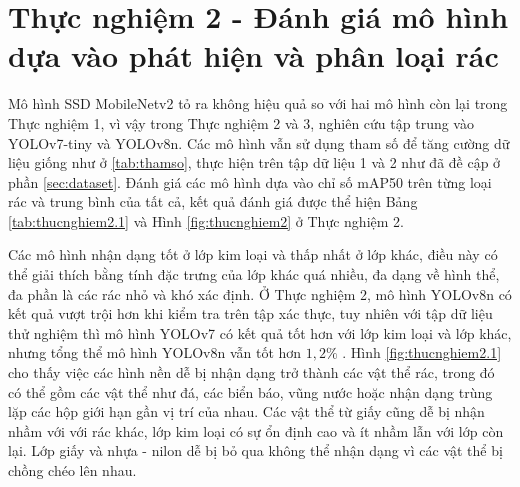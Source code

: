 \documentclass[../the.tex]{subfiles}
\begin{document}
\section{Thực nghiệm 2 - Đánh giá mô hình dựa vào phát hiện và phân loại rác}

 {\fontsize{13}{12} \selectfont

  Mô hình SSD MobileNetv2 tỏ ra không hiệu quả so với hai mô hình còn lại trong Thực nghiệm 1, vì vậy trong Thực nghiệm 2 và 3, nghiên cứu tập trung vào YOLOv7-tiny và YOLOv8n. 
  Các mô hình vẫn sử dụng tham số để tăng cường dữ liệu giống như ở \ref{tab:thamso}, thực hiện trên tập dữ liệu 1 và 2 như đã đề cập ở phần \ref{sec:dataset}.
  Đánh giá các mô hình dựa vào chỉ số mAP50 trên từng loại rác và trung bình của tất cả, kết quả đánh giá được thể hiện Bảng \ref{tab:thucnghiem2.1} và Hình \ref{fig:thucnghiem2} ở Thực nghiệm 2.
 
  }

\bigskip

{\fontsize{13}{12} \selectfont

    Các mô hình nhận dạng tốt ở lớp kim loại và thấp nhất ở lớp khác,
    điều này có thể giải thích bằng tính đặc trưng của lớp khác quá nhiều, đa dạng về hình thể, đa phần là các rác nhỏ và khó xác định.
    Ở Thực nghiệm 2, mô hình YOLOv8n có kết quả vượt trội hơn khi kiểm tra trên tập xác thực, tuy nhiên với tập dữ liệu thử nghiệm thì mô hình YOLOv7 có kết quả tốt hơn với lớp kim loại và lớp khác, nhưng tổng thể mô hình YOLOv8n vẫn tốt hơn $1,2\%$ .
    Hình \ref{fig:thucnghiem2.1} cho thấy việc các hình nền dễ bị nhận dạng trở thành các vật thể rác, trong đó có thể gồm các vật thể như đá, các biển báo, vũng nước hoặc nhận dạng trùng lặp các hộp giới hạn gần vị trí của nhau.
    Các vật thể từ giấy cũng dễ bị nhận nhầm với với rác khác, lớp kim loại có sự ổn định cao và ít nhầm lẫn với lớp còn lại. Lớp giấy và nhựa - nilon dễ bị bỏ qua không thể nhận dạng vì các vật thể bị chồng chéo lên nhau.

}
\end{document}
